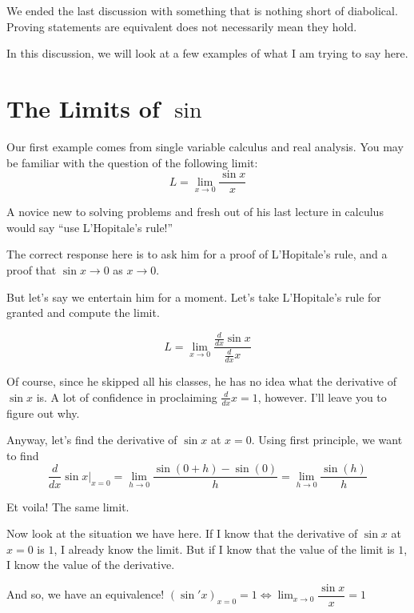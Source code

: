 

We ended the last discussion with something that is nothing short of diabolical. Proving statements are equivalent does not necessarily mean they hold.

In this discussion, we will look at a few examples of what I am trying to say here.
\section*{The Limits of $\sin$}
Our first example comes from single variable calculus and real analysis. You may be familiar with the question of the following limit:
\begin{equation*}
    L = \lim_{x \to 0} \dfrac{\sin x}{x}
\end{equation*}

A novice new to solving problems and fresh out of his last lecture in calculus would say ``use L'Hopitale's rule!''

The correct response here is to ask him for a proof of L'Hopitale's rule, and a proof that $\sin x \rightarrow 0$ as $x \rightarrow 0$.

But let's say we entertain him for a moment. Let's take L'Hopitale's rule for granted and compute the limit.

\[
L = \lim_{x \to 0} \dfrac{\frac{d}{dx} \sin x}{\frac{d}{dx} x}
\]

Of course, since he skipped all his classes, he has no idea what the derivative of $\sin x$ is. A lot of confidence in proclaiming $\frac{d}{dx}x = 1$, however. I'll leave you to figure out why.

Anyway, let's find the derivative of $\sin x$ at $x = 0$. Using first principle, we want to find
\[
\frac{d}{dx} \sin x \bigg|_{x=0} = \lim_{h \to 0} \dfrac{\sin(0 + h) - \sin(0)}{h} = \lim_{h \to 0} \dfrac{\sin(h)}{h}
\]

Et voila! The same limit. 

Now look at the situation we have here. If I know that the derivative of $\sin x$ at $x = 0$ is $1$, I already know the limit. But if I know that the value of the limit is $1$, I know the value of the derivative.

And so, we have an equivalence! $(\sin' x)_{x = 0} = 1 \iff \lim _{x \rightarrow 0} \dfrac {\sin x} x = 1$

